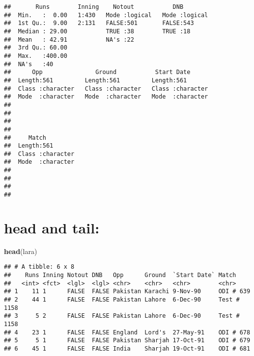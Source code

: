 \documentclass[]{book}
\newenvironment{Shaded}{\begin{snugshade}}{\end{snugshade}}
\newcommand{\KeywordTok}[1]{\textcolor[rgb]{0.13,0.29,0.53}{\textbf{#1}}}
\newcommand{\NormalTok}[1]{#1}
\begin{document}
\begin{verbatim}
##       Runs        Inning    Notout           DNB         
##  Min.   :  0.00   1:430   Mode :logical   Mode :logical  
##  1st Qu.:  9.00   2:131   FALSE:501       FALSE:543      
##  Median : 29.00           TRUE :38        TRUE :18       
##  Mean   : 42.91           NA's :22                       
##  3rd Qu.: 60.00                                          
##  Max.   :400.00                                          
##  NA's   :40                                              
##      Opp               Ground           Start Date       
##  Length:561         Length:561         Length:561        
##  Class :character   Class :character   Class :character  
##  Mode  :character   Mode  :character   Mode  :character  
##                                                          
##                                                          
##                                                          
##                                                          
##     Match          
##  Length:561        
##  Class :character  
##  Mode  :character  
##                    
##                    
##                    
## 
\end{verbatim}

\hypertarget{headtail}{%
\section*{\texorpdfstring{\textbf{head} and \textbf{tail}:}{head and tail:}}\label{headtail}}

\begin{Shaded}
\begin{Highlighting}[]
\KeywordTok{head}\NormalTok{(lara)}
\end{Highlighting}
\end{Shaded}

\begin{verbatim}
## # A tibble: 6 x 8
##    Runs Inning Notout DNB   Opp      Ground  `Start Date` Match      
##   <int> <fct>  <lgl>  <lgl> <chr>    <chr>   <chr>        <chr>      
## 1    11 1      FALSE  FALSE Pakistan Karachi 9-Nov-90     ODI # 639  
## 2    44 1      FALSE  FALSE Pakistan Lahore  6-Dec-90     Test # 1158
## 3     5 2      FALSE  FALSE Pakistan Lahore  6-Dec-90     Test # 1158
## 4    23 1      FALSE  FALSE England  Lord's  27-May-91    ODI # 678  
## 5     5 1      FALSE  FALSE Pakistan Sharjah 17-Oct-91    ODI # 679  
## 6    45 1      FALSE  FALSE India    Sharjah 19-Oct-91    ODI # 681
\end{verbatim}
\end{document}
